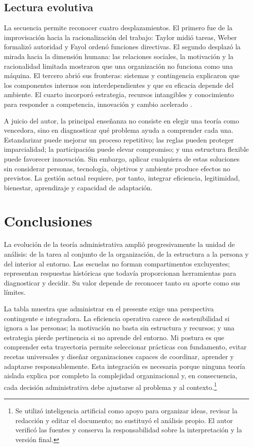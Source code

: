 \documentclass[11pt,letterpaper,oneside]{article}
\begin{document}
\subsection{Lectura evolutiva}

La secuencia permite reconocer cuatro desplazamientos. El primero fue de la improvisación hacia la racionalización del trabajo: Taylor midió tareas, Weber formalizó autoridad y Fayol ordenó funciones directivas. El segundo desplazó la mirada hacia la dimensión humana: las relaciones sociales, la motivación y la racionalidad limitada mostraron que una organización no funciona como una máquina. El tercero abrió sus fronteras: sistemas y contingencia explicaron que los componentes internos son interdependientes y que su eficacia depende del ambiente. El cuarto incorporó estrategia, recursos intangibles y conocimiento para responder a competencia, innovación y cambio acelerado \citep{larrarteSinFecha,sanchezBanuelos2017}.

A juicio del autor, la principal enseñanza no consiste en elegir una teoría como vencedora, sino en diagnosticar qué problema ayuda a comprender cada una. Estandarizar puede mejorar un proceso repetitivo; las reglas pueden proteger imparcialidad; la participación puede elevar compromiso; y una estructura flexible puede favorecer innovación. Sin embargo, aplicar cualquiera de estas soluciones sin considerar personas, tecnología, objetivos y ambiente produce efectos no previstos. La gestión actual requiere, por tanto, integrar eficiencia, legitimidad, bienestar, aprendizaje y capacidad de adaptación.

\clearpage
\section{Conclusiones}

La evolución de la teoría administrativa amplió progresivamente la unidad de análisis: de la tarea al conjunto de la organización, de la estructura a la persona y del interior al entorno. Las escuelas no forman compartimentos excluyentes; representan respuestas históricas que todavía proporcionan herramientas para diagnosticar y decidir. Su valor depende de reconocer tanto su aporte como sus límites.

La tabla muestra que administrar en el presente exige una perspectiva contingente e integradora. La eficiencia operativa carece de sostenibilidad si ignora a las personas; la motivación no basta sin estructura y recursos; y una estrategia pierde pertinencia si no aprende del entorno. Mi postura es que comprender esta trayectoria permite seleccionar prácticas con fundamento, evitar recetas universales y diseñar organizaciones capaces de coordinar, aprender y adaptarse responsablemente. Esta integración es necesaria porque ninguna teoría aislada explica por completo la complejidad organizacional y, en consecuencia, cada decisión administrativa debe ajustarse al problema y al contexto.\footnote{Se utilizó inteligencia artificial como apoyo para organizar ideas, revisar la redacción y editar el documento; no sustituyó el análisis propio. El autor verificó las fuentes y conserva la responsabilidad sobre la interpretación y la versión final.}

\clearpage

\end{document}

